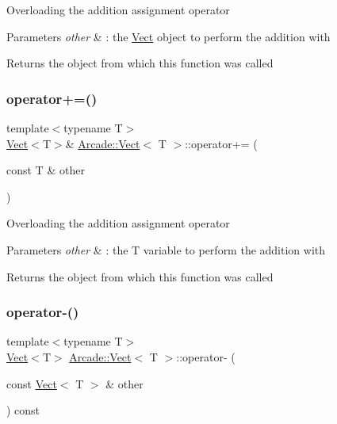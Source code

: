 Overloading the addition assignment operator 
\begin{DoxyParams}{Parameters}
{\em other} & \+: the \hyperlink{class_arcade_1_1_vect}{Vect} object to perform the addition with \\
\hline
\end{DoxyParams}
\begin{DoxyReturn}{Returns}
the object from which this function was called 
\end{DoxyReturn}
\mbox{\label{class_arcade_1_1_vect_a4da391cc6d6aaadc70819d7b50af6291}} 
\subsubsection{\texorpdfstring{operator+=()}{operator+=()}\hspace{0.1cm}{\footnotesize\ttfamily [2/2]}}
{\footnotesize\ttfamily template$<$typename T$>$ \\
\hyperlink{class_arcade_1_1_vect}{Vect}$<$T$>$\& \hyperlink{class_arcade_1_1_vect}{Arcade\+::\+Vect}$<$ T $>$\+::operator+= (\begin{DoxyParamCaption}\item[{const T \&}]{other }\end{DoxyParamCaption})\hspace{0.3cm}{\ttfamily [inline]}}

Overloading the addition assignment operator 
\begin{DoxyParams}{Parameters}
{\em other} & \+: the T variable to perform the addition with \\
\hline
\end{DoxyParams}
\begin{DoxyReturn}{Returns}
the object from which this function was called 
\end{DoxyReturn}
\mbox{\label{class_arcade_1_1_vect_a8dcc249d6a66e36cc75df3c809f2fd4f}} 
\subsubsection{\texorpdfstring{operator-\/()}{operator-()}\hspace{0.1cm}{\footnotesize\ttfamily [1/2]}}
{\footnotesize\ttfamily template$<$typename T$>$ \\
\hyperlink{class_arcade_1_1_vect}{Vect}$<$T$>$ \hyperlink{class_arcade_1_1_vect}{Arcade\+::\+Vect}$<$ T $>$\+::operator-\/ (\begin{DoxyParamCaption}\item[{const \hyperlink{class_arcade_1_1_vect}{Vect}$<$ T $>$ \&}]{other }\end{DoxyParamCaption}) const\hspace{0.3cm}{\ttfamily [inline]}}

